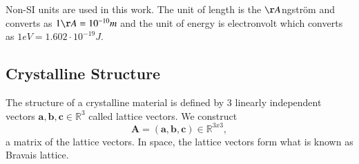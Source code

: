 \documentclass[11pt,oneside,czech,american]{book} %
\theoremstyle{definition} %
\theoremstyle{definition}
\begin{document}
Non-SI units are used in this work. The unit of length is the $\AA$ngström and converts as $1\AA = 10^{-10} m$ and the unit of energy is electronvolt which converts as $1 eV = 1.602 \cdot 10^{-19} J$.

\subsection{Crystalline Structure} \label{reducedhere}
The structure of a crystalline material is defined by 3 linearly independent vectors $\boldsymbol{a}, \boldsymbol{b}, \boldsymbol{c} \in \mathbb{R}^3$ called lattice vectors. We construct
\begin{equation}
	\bm{A} = (\boldsymbol{a}, \boldsymbol{b}, \boldsymbol{c}) \in \mathbb{R}^{3x3},
\end{equation}
a matrix of the lattice vectors. In space, the lattice vectors form what is known as Bravais lattice.
\end{document}
